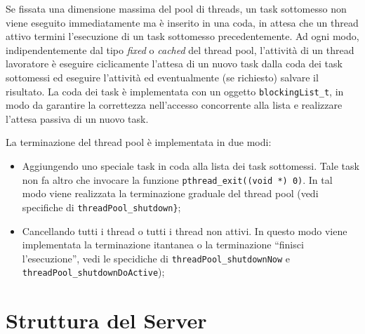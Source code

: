 \documentclass[a4paper,10pt]{article}
\begin{document}
Se fissata una dimensione massima del pool di threads, un task
sottomesso non viene eseguito immediatamente ma \`e inserito in una
coda, in attesa che un thread attivo termini l'esecuzione di un task
sottomesso precedentemente. Ad ogni modo, indipendentemente dal tipo
\emph{fixed} o \emph{cached} del thread pool, l'attivit\`a di un thread
lavoratore \`e eseguire ciclicamente l'attesa di un nuovo task dalla
coda dei task sottomessi ed eseguire l'attivit\`a ed eventualmente (se
richiesto) salvare il risultato. La coda dei task \`e implementata con
un oggetto \verb+blockingList_t+, in modo da garantire la correttezza
nell'accesso concorrente alla lista e realizzare l'attesa passiva di
un nuovo task.

La terminazione del thread pool \`e implementata in due modi: 
\begin{itemize} 
  \item Aggiungendo uno speciale task in coda alla lista dei task
    sottomessi. Tale task non fa altro che invocare la funzione
    \texttt{pthread\_exit((void *) 0)}. In tal modo viene realizzata la
    terminazione graduale del thread pool (vedi specifiche di
    \verb+threadPool_shutdown}+;
  \item Cancellando tutti i thread o tutti i thread non attivi. In
    questo modo viene implementata la terminazione itantanea o la
    terminazione ``finisci l'esecuzione'', vedi le specidiche di
    \verb+threadPool_shutdownNow+ e
    \texttt{threadPo\-ol\_shutdownDoActive});
\end{itemize}


\section{Struttura del Server}
\end{document}
